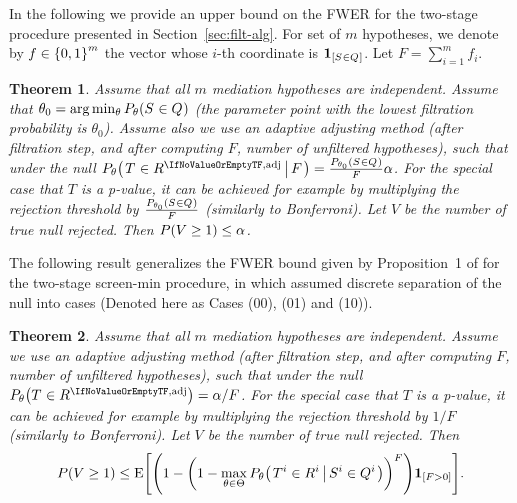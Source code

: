 \documentclass[ejs, twoside]{imsart}
\theoremstyle{plain}
\newtheorem{theorem}{Theorem}[section]
\theoremstyle{remark}
\newcommand{\fullstop}{\text{.}}
\newcommand{\nullcase}[1]{(#1)}
\newcommand{\cond}[2]{\left.{#1}\,\middle|\,{#2}\right.}
\numberwithin{equation}{section}
\numberwithin{table}{section}
\numberwithin{figure}{section}
\let\originalleft\left
\let\originalright\right
\renewcommand{\left}{\mathopen{}\mathclose\bgroup\originalleft}
\renewcommand{\right}{\aftergroup\egroup\originalright}
\begin{document}
In the following we provide an upper bound on the FWER for the two-stage procedure presented in Section~\ref{sec:filt-alg}.  %
For set of \(m\) hypotheses, we denote by \(f \in \left\lbrace 0, 1 \right\rbrace^m \) the vector whose \(i\)-th coordinate is \(\indc{\nfilevent}\). Let \(F = \sum_{i=1}^{m} f_i\).








\begin{theorem} \label{thm:fwercontrol}
	Assume that all \(m\) mediation hypotheses are independent.
	Assume that \(\theta_0 = \arg\min_{\theta}{P_\theta\left(\nfilevent \right) }\) (the parameter point with the lowest filtration probability is \(\theta_0\)). Assume also we use an adaptive adjusting method (after filtration step, and after computing \(F\), number of unfiltered hypotheses), such that under the null \(P_{\theta}\left(\cond{\baserejeventadj}{F} \right) = \frac{P_{\theta_0}\left( \nfilevent \right)}{F} \alpha \). For the special case that \(T\) is a p-value, it can be achieved for example by multiplying the rejection threshold by \(\frac{P_{\theta_0}\left( \nfilevent \right)}{F}\) (similarly to Bonferroni). Let \(V\) be the number of true null rejected. Then
	\(P\left(V \geq 1 \right) \leq \alpha \).
\end{theorem}

The following result generalizes the FWER bound given by Proposition~1 of \citet{djordjilovic_optimal_2020} for the two-stage screen-min procedure, in which \citet{djordjilovic_optimal_2020} assumed discrete separation of the null into cases (Denoted here as Cases \nullcase{00}, \nullcase{01} and \nullcase{10}).

\begin{theorem} \label{thm:fwerbound}
	Assume that all \(m\) mediation hypotheses are independent.
	Assume we use an adaptive adjusting method (after filtration step, and after computing \(F\), number of unfiltered hypotheses), such that under the null \(P_{\theta}\left(\baserejeventadj \right) = \alpha/F \). For the special case that \(T\) is a p-value, it can be achieved for example by multiplying the rejection threshold by \(1/F\) (similarly to Bonferroni). Let \(V\) be the number of true null rejected. Then
	\[P\left(V \geq 1 \right) \leq \mean{\left(1 - \left( 1 - \max_{\theta\in\Theta }P_\theta \left(\cond{T^i \in R^i}{S^i \in Q^i}\right) \right)^{F}  \right)\indc{F>0} } \fullstop \]
\end{theorem}
\end{document}
